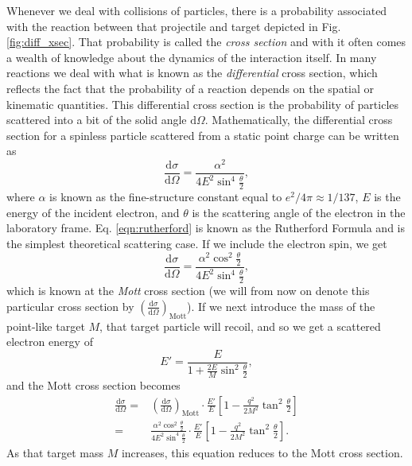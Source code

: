 Whenever we deal with collisions of particles, there is a probability associated with the reaction between that projectile and target depicted in Fig. \ref{fig:diff_xsec}. That probability is called the \textit{cross section} and with it often comes a wealth of knowledge about the dynamics of the interaction itself. In many reactions we deal with what is known as the \textit{differential} cross section, which reflects the fact that the probability of a reaction depends on the spatial or kinematic quantities. This differential cross section is the probability of particles scattered into a bit of the solid angle $\mathrm{d}\Omega$. Mathematically, the differential cross section for a spinless particle scattered from a static point charge can be written\cite{book:parts_nucs} as  
\begin{equation}
\label{eqn:rutherford}
\frac{\mathrm{d}\sigma}{\mathrm{d}\Omega} = \frac{\alpha^2}{4E^2\sin^4 \frac{\theta}{2}},
\end{equation}
where $\alpha$ is known as the fine-structure constant equal to $e^2/4\pi \approx 1/137$, $E$ is the energy of the incident electron, and $\theta$ is the scattering angle of the electron in the laboratory frame. Eq. \ref{eqn:rutherford} is known as the Rutherford Formula and is the simplest theoretical scattering case. If we include the electron spin, we get
\begin{equation}
\label{eqn:mott}
\frac{\mathrm{d}\sigma}{\mathrm{d}\Omega} = \frac{\alpha^2 \cos^2 \frac{\theta}{2}}{4E^2\sin^4 \frac{\theta}{2}},
\end{equation}
which is known at the \textit{Mott} cross section (we will from now on denote this particular cross section by $\left( \tfrac{\mathrm{d}\sigma}{\mathrm{d}\Omega} \right)_{\mathrm{Mott}}$). If we next introduce the mass of the point-like target $M$, that target particle will recoil, and so we get a scattered electron energy of 
\begin{equation}
E' = \frac{E}{1+\frac{2E}{M}\sin^2 \frac{\theta}{2}},
\end{equation}
and the Mott cross section becomes
\begin{eqnarray}
\nonumber
\frac{\mathrm{d}\sigma}{\mathrm{d}\Omega} =& \left( \frac{\mathrm{d}\sigma}{\mathrm{d}\Omega} \right)_{\mathrm{Mott}} \cdot \frac{E'}{E} \left[ 1-\frac{q^2}{2M^2}\tan^2 \frac{\theta}{2} \right] \\
=& \frac{\alpha^2 \cos^2 \frac{\theta}{2}}{4E^2\sin^4 \frac{\theta}{2}} \cdot \frac{E'}{E} \left[ 1-\frac{q^2}{2M^2}\tan^2 \frac{\theta}{2} \right].
\end{eqnarray}
As that target mass $M$ increases, this equation reduces to the Mott cross section. 

